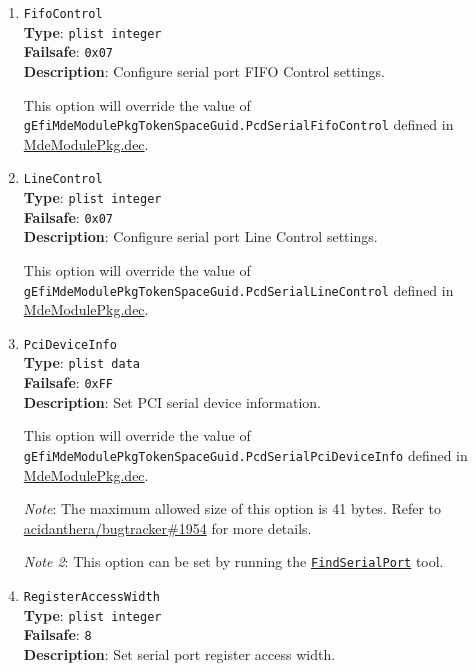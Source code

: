 \documentclass[]{article}
\begin{document}
\begin{enumerate}
\item
  \texttt{FifoControl}\\
  \textbf{Type}: \texttt{plist\ integer}\\
  \textbf{Failsafe}: \texttt{0x07}\\
  \textbf{Description}: Configure serial port FIFO Control settings.

  This option will override the value of \texttt{gEfiMdeModulePkgTokenSpaceGuid.PcdSerialFifoControl}
  defined in \href{https://github.com/acidanthera/audk/blob/master/MdeModulePkg/MdeModulePkg.dec}{MdeModulePkg.dec}.

\item
  \texttt{LineControl}\\
  \textbf{Type}: \texttt{plist\ integer}\\
  \textbf{Failsafe}: \texttt{0x07}\\
  \textbf{Description}: Configure serial port Line Control settings.

  This option will override the value of \texttt{gEfiMdeModulePkgTokenSpaceGuid.PcdSerialLineControl}
  defined in \href{https://github.com/acidanthera/audk/blob/master/MdeModulePkg/MdeModulePkg.dec}{MdeModulePkg.dec}.

\item
  \texttt{PciDeviceInfo}\\
  \textbf{Type}: \texttt{plist\ data}\\
  \textbf{Failsafe}: \texttt{0xFF}\\
  \textbf{Description}: Set PCI serial device information.

  This option will override the value of \texttt{gEfiMdeModulePkgTokenSpaceGuid.PcdSerialPciDeviceInfo}
  defined in \href{https://github.com/acidanthera/audk/blob/master/MdeModulePkg/MdeModulePkg.dec}{MdeModulePkg.dec}.

  \emph{Note}: The maximum allowed size of this option is 41 bytes. Refer to
  \href{https://github.com/acidanthera/bugtracker/issues/1954#issuecomment-1084220743}{acidanthera/bugtracker\#1954}
  for more details.

  \emph{Note 2}: This option can be set by running the
  \href{https://github.com/acidanthera/MaxRegnerPkg/tree/master/Utilities/FindSerialPort}{\texttt{FindSerialPort}} tool.

\item
  \texttt{RegisterAccessWidth}\\
  \textbf{Type}: \texttt{plist\ integer}\\
  \textbf{Failsafe}: \texttt{8}\\
  \textbf{Description}: Set serial port register access width.


\end{enumerate}
\end{document}
